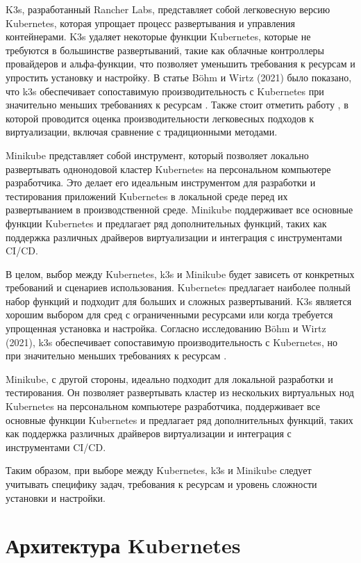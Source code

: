 K3s, разработанный Rancher Labs, представляет собой легковесную версию
Kubernetes, которая упрощает процесс развертывания и управления
контейнерами. K3s удаляет некоторые функции Kubernetes, которые
не требуются в большинстве развертываний, такие как облачные
контроллеры провайдеров и альфа-функции, что позволяет уменьшить
требования к ресурсам и упростить установку и настройку. В статье
Böhm и Wirtz (2021) было показано, что k3s обеспечивает
сопоставимую производительность с Kubernetes при значительно
меньших требованиях к ресурсам \cite{bohm2021profiling}. Также стоит отметить
работу
\cite{plauth2017performance}, в которой проводится оценка производительности
легковесных подходов
к виртуализации, включая сравнение с традиционными методами.

Minikube представляет собой инструмент, который позволяет локально
развертывать однонодовой кластер Kubernetes на персональном компьютере
разработчика. Это делает его идеальным инструментом для разработки и 
тестирования приложений Kubernetes в локальной среде перед их
развертыванием в производственной среде. Minikube поддерживает все
основные функции Kubernetes и предлагает ряд дополнительных функций,
таких как поддержка различных драйверов виртуализации и интеграция с
инструментами CI/CD.

В целом, выбор между Kubernetes, k3s и Minikube будет зависеть от
конкретных требований и сценариев использования. Kubernetes предлагает
наиболее полный набор функций и подходит для больших и сложных
развертываний. K3s является хорошим выбором для сред с
ограниченными ресурсами или когда требуется упрощенная установка и
настройка. Согласно исследованию Böhm и Wirtz (2021), k3s обеспечивает
сопоставимую производительность с Kubernetes, но при значительно меньших
требованиях к ресурсам \cite{bohm2021profiling}.

Minikube, с другой стороны, идеально подходит для локальной
разработки и тестирования. Он позволяет развертывать кластер из нескольких
виртуальных нод Kubernetes на персональном компьютере разработчика,
поддерживает все основные функции Kubernetes и предлагает ряд
дополнительных функций, таких как поддержка различных драйверов
виртуализации и интеграция с инструментами CI/CD.

Таким образом, при выборе между Kubernetes, k3s и
Minikube следует учитывать специфику задач, требования
к ресурсам и уровень сложности установки и настройки.


\section{Архитектура Kubernetes}

